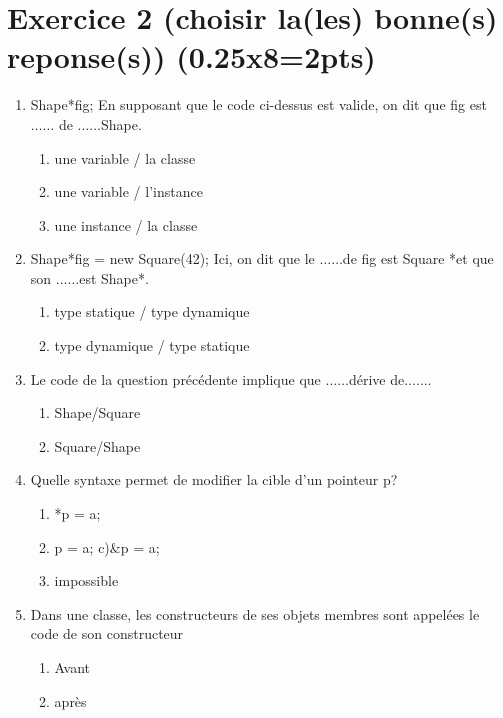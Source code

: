 \section*{Exercice 2 \scriptsize{(choisir la(les) bonne(s) reponse(s)) (0.25x8=2pts)}}

\begin{enumerate}
    \item Shape*fig;
          En supposant que le code ci-dessus est valide, on dit que fig est $\dots\dots$ de $\dots\dots$Shape.

          \begin{enumerate}
              \item une variable / la classe
              \item une variable / l’instance
              \item une instance / la classe
          \end{enumerate}
    \item  Shape*fig = new Square(42);
          Ici, on dit que le $\dots\dots$de fig est Square *et que son $\dots\dots$est Shape*.
          \begin{enumerate}
              \item type statique / type dynamique
              \item  type dynamique / type statique
          \end{enumerate}
    \item Le code de la question précédente implique que $\dots\dots$dérive de$\dots\dots$.
          \begin{enumerate}
              \item  Shape/Square
              \item Square/Shape
          \end{enumerate}
    \item Quelle syntaxe permet de modifier la cible d’un pointeur p?
          \begin{enumerate}
              \item *p = a;
              \item p = a; c)\&p = a;
              \item impossible
          \end{enumerate}
    \item Dans une classe, les constructeurs de ses objets membres sont appelées le code de son constructeur
          \begin{enumerate}
              \item Avant
              \item après

\end{enumerate}
\end{enumerate}

